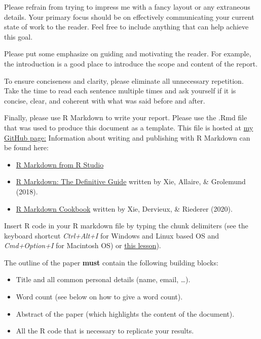 \documentclass[
  12pt,
]{article}
\providecommand{\tightlist}{%
  \setlength{\itemsep}{0pt}\setlength{\parskip}{0pt}}
\begin{document}
Please refrain from trying to impress me with a fancy layout or any extraneous details. Your primary focus should be on effectively communicating your current state of work to the reader. Feel free to include anything that can help achieve this goal.

Please put some emphasize on guiding and motivating the reader. For example, the introduction is a good place to introduce the scope and content of the report.

To ensure conciseness and clarity, please eliminate all unnecessary repetition. Take the time to read each sentence multiple times and ask yourself if it is concise, clear, and coherent with what was said before and after.

Finally, please use R Markdown to write your report. Please use the .Rmd file that was used to produce this document as a template. This file is hosted at \href{https://github.com/hubchev/courses/tree/main/rmd}{my GitHub page:} Information about writing and publishing with R Markdown can be found here:

\begin{itemize}
\tightlist
\item
  \href{https://rmarkdown.rstudio.com/lesson-1.html}{R Markdown from R Studio}
\item
  \href{https://bookdown.org/yihui/rmarkdown/}{R Markdown: The Definitive Guide} written by Xie, Allaire, \& Grolemund (2018).
\item
  \href{https://bookdown.org/yihui/rmarkdown-cookbook/}{R Markdown Cookbook} written by Xie, Dervieux, \& Riederer (2020).
\end{itemize}

Insert R code in your R markdown file by typing the chunk delimiters (see the keyboard shortcut \emph{Ctrl+Alt+I} for Windows and Linux based OS and \emph{Cmd+Option+I} for Macintosh OS) or \href{https://rmarkdown.rstudio.com/lesson-3.html}{this lesson}).

The outline of the paper \textbf{must} contain the following building blocks:

\begin{itemize}
\tightlist
\item
  Title and all common personal details (name, email, \ldots).
\item
  Word count (see below on how to give a word count).
\item
  Abstract of the paper (which highlights the content of the document).
\item
  All the R code that is necessary to replicate your results.
\end{itemize}
\end{document}
